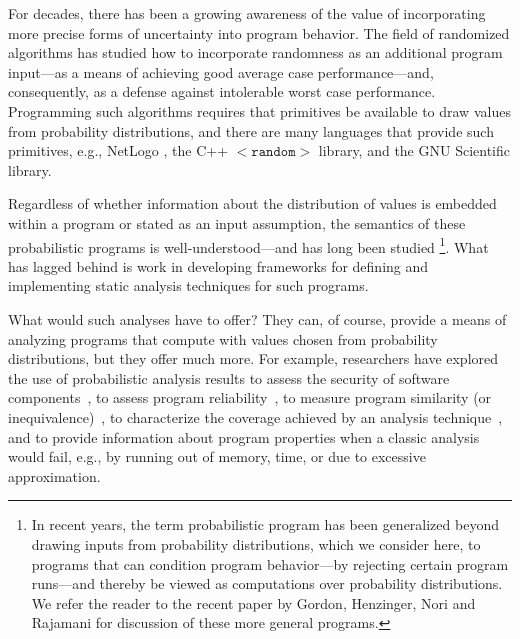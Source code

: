 For decades, there has been a growing awareness of the value of 
incorporating more precise forms of uncertainty into program behavior.  
The field of randomized algorithms has studied how to incorporate
randomness as an additional program input---as a means of achieving
good average case performance---and, consequently, as a defense against
intolerable worst case performance.
Programming such algorithms requires that primitives be available
to draw values from probability distributions, and there are many
languages that provide such primitives, e.g., NetLogo \cite{tisue2004netlogo},
the C++ \texttt{$\mathtt{<random>}$} library, and the GNU Scientific library.

Regardless of whether information about the distribution of
values is embedded within a program or stated as an input assumption,
the semantics of these probabilistic programs is well-understood---and
has long been studied 
\cite{kozen1981semantics,kozen1983probabilistic,jones1990probabilistic,morgan1996probabilistic}
\footnote{In recent
years, the term probabilistic program has been generalized beyond
drawing inputs from probability distributions, which we
consider here, to programs that can condition program behavior---by
rejecting certain program runs---and thereby be viewed as
computations over probability distributions.  We refer the reader to the
recent paper by Gordon, Henzinger, Nori and Rajamani \cite{Gordon2014}
for discussion of these more general programs.}. 
What has lagged behind is work in developing frameworks for 
defining and implementing static analysis techniques for such programs.

What would such analyses have to offer?
They can, of course, provide a means of analyzing programs that compute
with values chosen from probability distributions, but they offer much
more.
For example, researchers have explored the use of probabilistic analysis
results to assess the security of software components~\cite{probabilisticPolyhedra},
to assess program reliability~\cite{FilieriICSE13}, to measure program
similarity (or inequivalence)~\cite{GeldenhuysISSTA12}, 
to characterize the coverage
achieved by an analysis technique~\cite{DwyerASE11}, and to provide information
about program properties when a classic analysis would fail, e.g.,
by running out of memory, time, or due to excessive approximation.

